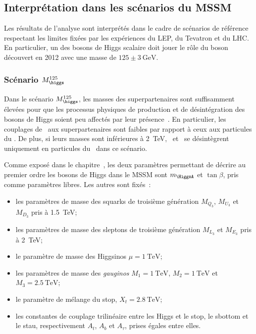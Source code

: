 \subsection{Interprétation dans les scénarios du MSSM}\label{chapter-HTT_analysis-section-signal_extraction-benchmarks}
Les résultats de l'analyse sont interprétés dans le cadre de scénarios de référence~\cite{Bagnaschi_2019}
respectant les limites fixées par les expériences du LEP, du Tevatron et du LHC.
En particulier, un des bosons de Higgs scalaire doit jouer le rôle du boson découvert en 2012 avec une masse de $\num{125}\pm\SI{3}{\GeV}$.
\subsubsection{Scénario $M_{\higgs}^{125}$}\label{chapter-HTT_analysis-section-signal_extraction-benchmarks-mh125}
Dans le scénario $M_{\higgs}^{125}$,
les masses des superpartenaires sont suffisamment élevées
pour que les processus physiques de production et de désintégration
des bosons de Higgs soient peu affectés par leur présence~\cite{Bagnaschi_2019}.
En particulier, les couplages de \higgs\ aux superpartenaires
sont faibles par rapport à ceux aux particules du \SM.
De plus, si leurs masses sont inférieures à \SI{2}{\TeV}, \Higgs\ et \HiggsA\ se désintègrent uniquement en particules du \SM\ dans ce scénario.
\par
Comme exposé dans le chapitre~,
les deux paramètres permettant de décrire au premier ordre les bosons de Higgs dans le MSSM
sont $m_{\HiggsA}$ et $\tan\beta$,
pris comme paramètres libres.
Les autres sont fixés~\cite{Bagnaschi_2019}:
\begin{itemize}
\item les paramètres de masse des squarks de troisième génération $M_{Q_3}$, $M_{U_3}$ et $M_{D_3}$ pris à \SI{1.5}{\TeV};
\item les paramètres de masse des sleptons de troisième génération $M_{L_3}$ et $M_{E_3}$ pris à \SI{2}{\TeV};
\item le paramètre de masse des Higgsinos $\mu=\SI{1}{\TeV}$;
\item les paramètres de masse des \emph{gauginos} $M_1=\SI{1}{\TeV}$, $M_2=\SI{1}{\TeV}$ et $M_3=\SI{2.5}{\TeV}$;
\item le paramètre de mélange du stop, $X_t=\SI{2.8}{\TeV}$;
\item les constantes de couplage trilinéaire entre les Higgs et le stop, le sbottom et le stau, respectivement $A_t$, $A_b$ et $A_\tau$, prises égales entre elles.
\end{itemize}
